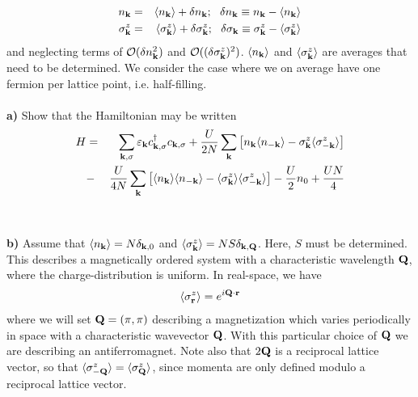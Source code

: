 \begin{problem}
\begin{eqnarray}
	n_{\bf k} & = & \langle n_{\bf k} \rangle + \delta n_{\bf k}; ~~  \delta n_{\bf k} \equiv n_{\bf k} - \langle n_{\bf k} \rangle \nonumber  \\
	\sigma^z_{\bf k} & = & \langle \sigma^z_{\bf k} \rangle + \delta \sigma^z_{\bf k}; ~~  \delta \sigma_{\bf k} \equiv \sigma^z_{\bf k} - \langle \sigma^z_{\bf k} \rangle \nonumber  
\end{eqnarray}
and neglecting terms of ${\cal O}(\delta n_{\bf k}^2) $ and  ${\cal O}((\delta \sigma^z_{\bf k})^2) $.
$\langle n_{\bf k} \rangle$  and $\langle \sigma^z_{\bf k} \rangle$ are averages that need to be determined. We consider the case where we on average have one fermion per lattice point, i.e. half-filling.
\ \\
\ \\
{\bf a)} Show that the Hamiltonian may be written 
\begin{eqnarray}
	H & = & \sum_{{\bf k},\sigma}{ \varepsilon_{{\bf k}}}  c^{\dagger}_{{\bf k},\sigma} c_{{\bf k},\sigma}
	+ \frac{U}{2N} \sum_{{\bf k}} 
	\left[ n_{\bf k}  \langle n_{-\bf k} \rangle   - \sigma^z_{\bf k}  \langle \sigma^z_{-\bf k} \rangle  \right]  
	\\ &-&   \frac{U}{4N} \sum_{{\bf k}} 
	\left[ \langle n_{\bf k} \rangle  \langle  n_{-\bf k} \rangle   - \langle  \sigma^z_{\bf k} \rangle \langle \sigma^z_{-\bf k} \rangle  \right] 
	- \frac{U}{2}  n_{0}
	+\frac{U N}{4}
	\nonumber
\end{eqnarray}
\ \\
\ \\
{\bf b)} Assume that $\langle n_{\bf k} \rangle = N \delta_{{\bf k},0}$ and $ \langle \sigma^z_{\bf k} \rangle =  N S \delta_{{\bf k},{\bf Q}}$. Here, $S$ must be determined. This describes a magnetically ordered system with a characteristic wavelength ${\bf Q}$, where the charge-distribution is uniform. In real-space, we have
\begin{eqnarray}
	\langle \sigma^z_{\bf r} \rangle = e^{i {\bf Q} \cdot {\bf r}} \nonumber
\end{eqnarray}  
where we will set ${\bf Q}=(\pi,\pi)$
describing a magnetization which varies periodically in space with a characteristic wavevector ${\bf Q}$.  With this particular choice of ${\bf Q}$
we are describing an antiferromagnet. Note also that $2 {\bf Q}$ is a reciprocal lattice vector, so that 
$\langle  \sigma^z_{-\bf Q} \rangle  = \langle \sigma^z_{\bf Q} \rangle $, since momenta are only defined modulo a reciprocal lattice vector.

\end{problem}
